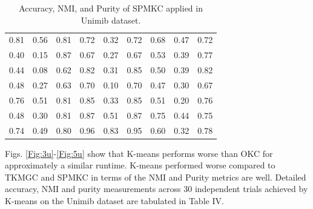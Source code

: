 \documentclass[10pt,final]{IEEEtran}
\begin{document}
\begin{center}
\begin{table}[h!]
\begin{tabular}{|c|c|c|c|c|c|c|c|c|}
    0.81 & 0.56 & 0.81 & 0.72 & 0.32 & 0.72 & 0.68 & 0.47 & 0.72\\
    0.40 & 0.15 & 0.87 & 0.67 & 0.27 & 0.67 & 0.53 & 0.39 & 0.77\\
    0.44 & 0.08 & 0.62 & 0.82 & 0.31 & 0.85 & 0.50 & 0.39 & 0.82\\
    0.48 & 0.27 & 0.63 & 0.70 & 0.10 & 0.70 & 0.47 & 0.30 & 0.67\\
    0.76 & 0.51 & 0.81 & 0.85 & 0.33 & 0.85 & 0.51 & 0.20 & 0.76\\
    0.48 & 0.30 & 0.81 & 0.87 & 0.51 & 0.87 & 0.75 & 0.44 & 0.75\\
    0.74 & 0.49 & 0.80 & 0.96 & 0.83 & 0.95 & 0.60 & 0.32 & 0.78\\
    \hline
\end{tabular}
\caption{\label{tab:Table III}Accuracy, NMI, and Purity of SPMKC applied in Unimib dataset.}
\end{table}
\end{center}

Figs. \ref{Fig:3u}-\ref{Fig:5u} show that K-means performs worse than OKC for approximately a similar runtime. K-means performed worse compared to  TKMGC and SPMKC in terms of the NMI and Purity metrics are well. Detailed accuracy, NMI and purity measurements across $30$ independent trials achieved by K-means on the Unimib dataset are tabulated in Table IV.
\end{document}
